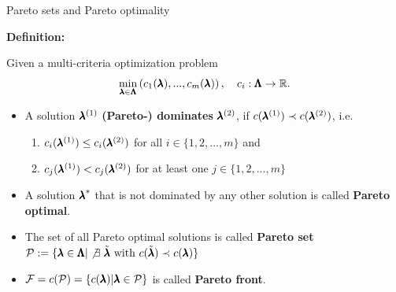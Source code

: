 \begin{frame}{Pareto sets and Pareto optimality}

\textbf{Definition:}

Given a multi-criteria optimization problem
    $$\min_{\pmb{\lambda} \in \pmb{\Lambda}} \left(c_1(\pmb{\lambda}), ..., c_m(\pmb{\lambda})\right), \quad c_i: \pmb{\Lambda} \to \mathbb{R}.$$

\begin{itemize}
    \item A solution $\pmb{\lambda}^{(1)}$ \textbf{(Pareto-) dominates} $\pmb{\lambda}^{(2)}$, if $c(\pmb{\lambda}^{(1)}) \prec c(\pmb{\lambda}^{(2)})$, i.e.
\begin{enumerate}
    \item $c_i(\pmb{\lambda}^{(1)}) \le c_i(\pmb{\lambda}^{(2)})$ for all $i \in \{1, 2, ..., m\}$ and
    \item $c_j(\pmb{\lambda}^{(1)}) < c_j(\pmb{\lambda}^{(2)})$ for at least one $j \in \{1, 2, ..., m\}$
\end{enumerate}
\vspace*{0.1cm}
\item A solution ${\pmb{\lambda}}^*$ that is not dominated by any other solution is called \textbf{Pareto optimal}.
\vspace*{0.1cm}
\item The set of all Pareto optimal solutions is called \textbf{Pareto set} $\mathcal{P} := \{\pmb{\lambda} \in \pmb{\Lambda} |\not \exists ~\tilde{\pmb{\lambda}} \text{ with } c(\tilde{\pmb{\lambda}}) \prec c(\pmb{\lambda})\}$
\item $\mathcal{F} = c(\mathcal{P}) = \{c(\pmb{\lambda}) | \pmb{\lambda} \in \mathcal{P}\}$ is called \textbf{Pareto front}.
\end{itemize}

\end{frame}


